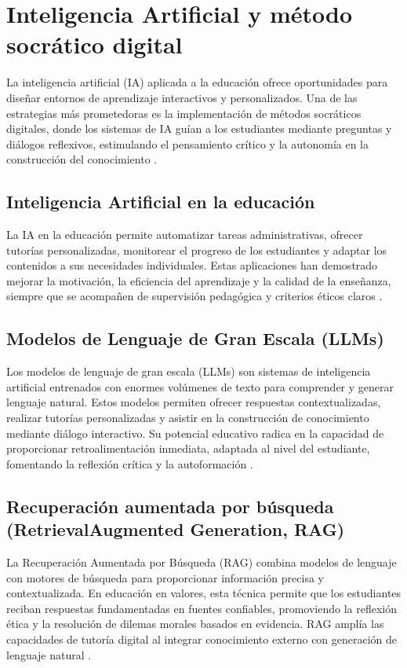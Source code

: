 \section{Inteligencia Artificial y método socrático digital}
La inteligencia artificial (IA) aplicada a la educación ofrece oportunidades
para diseñar entornos de aprendizaje interactivos y personalizados. Una de las
estrategias más prometedoras es la implementación de métodos socráticos
digitales, donde los sistemas de IA guían a los estudiantes mediante preguntas
y diálogos reflexivos, estimulando el pensamiento crítico y la autonomía en la
construcción del conocimiento \cite{holmes2019ai, graesser2021ai}.

\subsection{Inteligencia Artificial en la educación}
La IA en la educación permite automatizar tareas administrativas, ofrecer
tutorías personalizadas, monitorear el progreso de los estudiantes y adaptar
los contenidos a sus necesidades individuales. Estas aplicaciones han
demostrado mejorar la motivación, la eficiencia del aprendizaje y la calidad de
la enseñanza, siempre que se acompañen de supervisión pedagógica y criterios
éticos claros \cite{elstad2024ai, frontiers2025education, carter2024ethics}.

\subsection{Modelos de Lenguaje de Gran Escala (LLMs)}
Los modelos de lenguaje de gran escala (LLMs) son sistemas de inteligencia
artificial entrenados con enormes volúmenes de texto para comprender y generar
lenguaje natural. Estos modelos permiten ofrecer respuestas contextualizadas,
realizar tutorías personalizadas y asistir en la construcción de conocimiento
mediante diálogo interactivo. Su potencial educativo radica en la capacidad de
proporcionar retroalimentación inmediata, adaptada al nivel del estudiante,
fomentando la reflexión crítica y la autoformación \cite{brown2020language,
    raffel2020exploring}.

\subsection{Recuperación aumentada por búsqueda (RetrievalAugmented Generation, RAG)}
La Recuperación Aumentada por Búsqueda (RAG) combina modelos de lenguaje con
motores de búsqueda para proporcionar información precisa y contextualizada. En
educación en valores, esta técnica permite que los estudiantes reciban
respuestas fundamentadas en fuentes confiables, promoviendo la reflexión ética
y la resolución de dilemas morales basados en evidencia. RAG amplía las
capacidades de tutoría digital al integrar conocimiento externo con generación
de lenguaje natural \cite{lewis2020retrieval, khandelwal2020generalization}.

